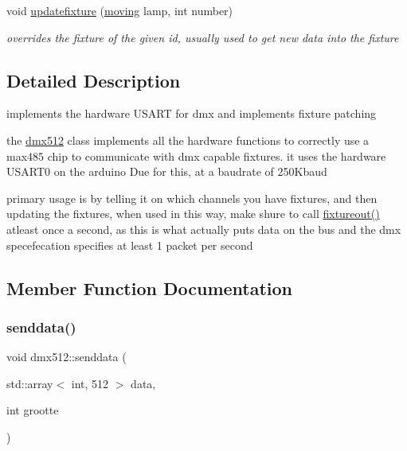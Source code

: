 \begin{DoxyCompactItemize}
\mbox{\label{classdmx512_a0c31875d2fed8d85cf5091f30eddd697}} 
void \hyperlink{classdmx512_a0c31875d2fed8d85cf5091f30eddd697}{updatefixture} (\hyperlink{classmoving}{moving} lamp, int number)
\begin{DoxyCompactList}\small\item\em overrides the fixture of the given id, usually used to get new data into the fixture \end{DoxyCompactList}\end{DoxyCompactItemize}


\subsection{Detailed Description}
implements the hardware U\+S\+A\+RT for dmx and implements fixture patching 

the \hyperlink{classdmx512}{dmx512} class implements all the hardware functions to correctly use a max485 chip to communicate with dmx capable fixtures. it uses the hardware U\+S\+A\+R\+T0 on the arduino Due for this, at a baudrate of 250\+Kbaud

primary usage is by telling it on which channels you have fixtures, and then updating the fixtures, when used in this way, make shure to call \hyperlink{classdmx512_a1d9cbfe77c6db4d1e0808ba6abede7a2}{fixtureout()} atleast once a second, as this is what actually puts data on the bus and the dmx specefecation specifies at least 1 packet per second 

\subsection{Member Function Documentation}
\mbox{\label{classdmx512_afcbc9b157dfebd6c35795738641761e9}} 
\subsubsection{\texorpdfstring{senddata()}{senddata()}}
{\footnotesize\ttfamily void dmx512\+::senddata (\begin{DoxyParamCaption}\item[{std\+::array$<$ int, 512 $>$}]{data,  }\item[{int}]{grootte }\end{DoxyParamCaption})}




